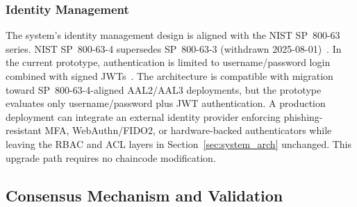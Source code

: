 \documentclass{ieeeaccess}
\begin{document}
\subsubsection{Identity Management}
The system's identity management design is aligned with the NIST
SP~800-63 series. NIST SP~800-63-4 supersedes SP~800-63-3
(withdrawn 2025-08-01)~\cite{nist800634,nist800-63b}. In the current
prototype, authentication is limited to username/password login
combined with signed JWTs~\cite{rfc7519jwt}. The architecture is
compatible with migration toward SP~800-63-4-aligned AAL2/AAL3
deployments, but the prototype evaluates only username/password plus
JWT authentication. A production deployment can integrate an external
identity provider enforcing phishing-resistant MFA, WebAuthn/FIDO2,
or hardware-backed authenticators while leaving the RBAC and ACL
layers in Section~\ref{sec:system_arch} unchanged. This upgrade path
requires no chaincode modification.

\subsection{Consensus Mechanism and Validation}
\label{sec:consensus}
\end{document}
